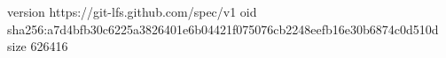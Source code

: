 version https://git-lfs.github.com/spec/v1
oid sha256:a7d4bfb30c6225a3826401e6b04421f075076cb2248eefb16e30b6874c0d510d
size 626416
